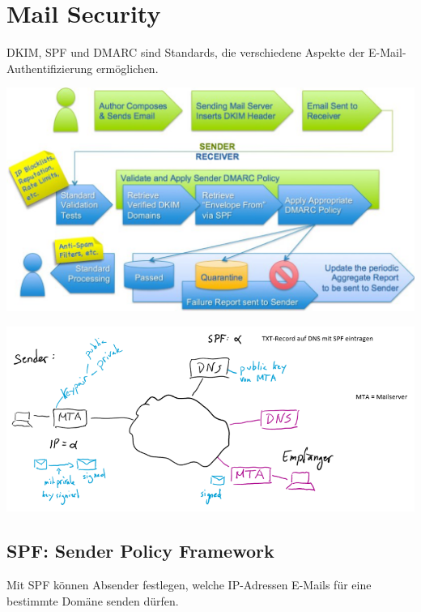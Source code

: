 


\section{Mail Security}
DKIM, SPF und DMARC sind Standards, die verschiedene Aspekte der E-Mail-Authentifizierung ermöglichen.
\begin{center}
    \vspace{-8pt}
    \includegraphics[width=.8\linewidth]{./img/07-mail_security/overview}
    \vspace{-8pt}
\end{center}
\begin{center}
    \vspace{-8pt}
    \includegraphics[width=1.0\linewidth]{./img/07-mail_security/spf_overview}
    \vspace{-8pt}
\end{center}

\subsection{SPF: Sender Policy Framework}
Mit SPF können Absender festlegen, welche IP-Adressen E-Mails für eine bestimmte Domäne senden dürfen.

